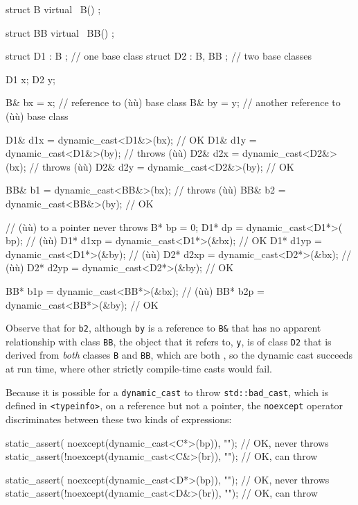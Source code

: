 \begin{emcppslisting}
struct B
{
   virtual ~B() {}
};

struct BB
{
   virtual ~BB() {}
};

struct D1 : B     { };  // one base class
struct D2 : B, BB { };  // two base classes

D1 x;
D2 y;

B& bx = x;  // reference to (ù{}ù) base class
B& by = y;  // another reference to (ù{}ù) base class

D1& d1x = dynamic_cast<D1&>(bx);    // OK
D1& d1y = dynamic_cast<D1&>(by);    // throws (ù{}ù)
D2& d2x = dynamic_cast<D2&>(bx);    // throws (ù{}ù)
D2& d2y = dynamic_cast<D2&>(by);    // OK

BB& b1 = dynamic_cast<BB&>(bx);     // throws (ù{}ù)
BB& b2 = dynamic_cast<BB&>(by);     // OK

// (ù{}ù) to a pointer never throws
B*  bp   = 0;
D1* dp   = dynamic_cast<D1*>( bp);  // (ù{}ù)
D1* d1xp = dynamic_cast<D1*>(&bx);  // OK
D1* d1yp = dynamic_cast<D1*>(&by);  // (ù{}ù)
D2* d2xp = dynamic_cast<D2*>(&bx);  // (ù{}ù)
D2* d2yp = dynamic_cast<D2*>(&by);  // OK

BB* b1p = dynamic_cast<BB*>(&bx);   // (ù{}ù)
BB* b2p = dynamic_cast<BB*>(&by);   // OK
\end{emcppslisting}
    

\noindent Observe that for \lstinline!b2!, although \lstinline!by! is a reference to
\lstinline!B&! that has no apparent relationship with class \lstinline!BB!,
the object that it refers to, \lstinline!y!, is of class \lstinline!D2! that
is derived from \emph{both} classes \lstinline!B! and \lstinline!BB!, which
are both , so the dynamic cast succeeds at run
time, where other strictly compile-time casts would fail.

Because it is possible for a \lstinline!dynamic_cast! to throw
\lstinline!std::bad_cast!, which is defined in \lstinline!<typeinfo>!, on a
reference but not a pointer, the \lstinline!noexcept! operator
discriminates between these two kinds of expressions:

\begin{emcppslisting}
static_assert( noexcept(dynamic_cast<C*>(bp)), "");  // OK, never throws
static_assert(!noexcept(dynamic_cast<C&>(br)), "");  // OK, can throw

static_assert( noexcept(dynamic_cast<D*>(bp)), "");  // OK, never throws
static_assert(!noexcept(dynamic_cast<D&>(br)), "");  // OK, can throw
\end{emcppslisting}
    

